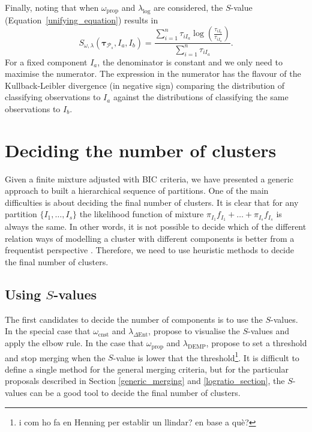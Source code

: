 \documentclass[submit]{smj}
\theoremstyle{definition}
\newcommand{\m}[1]{\boldsymbol{#1}}
\begin{document}
Finally, noting that when $\omega_{\text{prop}}$ and $\lambda_{\log}$ are considered, the $S$-value (Equation~\ref{unifying_equation}) results in
\[
S_{\omega, \lambda}( \m\tau_{\mathcal{P}_s},  I_a,  I_b) = \frac{\sum_{i=1}^n\tau_{iI_a}  \log \left(\frac{ \tau_{iI_b} }{ \tau_{iI_a} }\right)}{\sum_{i=1}^n \tau_{iI_a}}.
\]
For a fixed component $I_a$, the denominator is constant and we only need to maximise the numerator. The expression in the numerator has the flavour of the Kullback-Leibler divergence (in negative sign) comparing the distribution of classifying observations to $I_a$ against the distributions of classifying the same observations to $I_b$.

\section{Deciding the number of clusters}\label{number_clusters}

Given a finite mixture adjusted with BIC criteria, we have presented a generic approach to built a hierarchical sequence of partitions. One of the main difficulties is about deciding the final number of clusters. It is clear that for any partition $\{I_1, \dots, I_{s}\}$ the likelihood function of mixture $\pi_{I_1} f_{I_1} + \dots + \pi_{I_s} f_{I_s}$ is always the same. In other words, it is not possible to decide which of the different relation ways of modelling a cluster with different components is better from a frequentist perspective \citep{hennig2010methods}. Therefore, we need to use heuristic methods to decide the final number of clusters.

\subsection{Using $S$-values}

The first candidates to decide the number of components is to use the $S$-values. In the special case that $\omega_{\text{cnst}}$ and $\lambda_{\Delta\text{Ent}}$, \cite{baudry2010combining} propose to visualise the $S$-values and apply the elbow rule. In the case that $\omega_{\text{prop}}$ and $\lambda_{\text{DEMP}}$, \cite{hennig2010methods} propose to set a threshold and stop merging when the $S$-value is lower that the threshold\footnote{i com ho fa en Henning per establir un llindar? en base a què?}. It is difficult to define a single method for the general merging criteria, but for the particular proposals described in Section \ref{generic_merging} and \ref{logratio_section}, the $S$-values can be a good tool to decide the final number of clusters.
\end{document}
